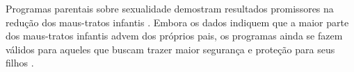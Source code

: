 








Programas parentais sobre sexualidade demostram resultados promissores na redução dos maus-tratos infantis \cite{silverman2008evidence}. Embora os dados indiquem que a maior parte dos maus-tratos infantis advem dos próprios pais, os programas ainda se fazem válidos para aqueles que buscam trazer maior segurança e proteção para seus filhos \cite{pelisoli2010prevenccao}.


  

